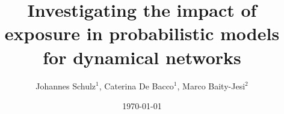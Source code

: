 \documentclass[12pt]{iopart}%
\begin{document}
\title{Investigating the impact of exposure in probabilistic models for dynamical networks}

\author{Johannes Schulz$^1$, Caterina De Bacco$^1$, Marco Baity-Jesi$^2$}


\address{$^1$ Max Planck Institute for Intelligent Systems, Cyber Valley, Tuebingen, 72076, Germany}
\address{$^2$ Eawag, \"Uberlandstrasse 133, CH-8600 D\"ubendorf, Switzerland}
\vspace{10pt}

\date{\today}



%
%
%
\maketitle
% 

%
%










\end{document}
